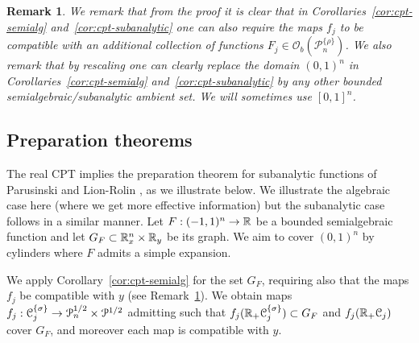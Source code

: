 \documentclass[reqno]{amsart}
\newtheorem{Rem}[Cor]{Remark}{\scshape}{\rmfamily}
\renewcommand\~[1]{\widetilde{#1}}
\def\cP{{\mathcal P}} \def\cR{{\mathcal R}}
\def\cO{{\mathcal O}}
\def\he#1{{\{#1\}}}
\def\hrho{{\he\rho}}
\def\hsigma{{\he\sigma}}
\begin{document}
\begin{Rem}\label{rem:cpt-semi-extra}
  We remark that from the proof it is clear that in
  Corollaries~\ref{cor:cpt-semialg} and~\ref{cor:cpt-subanalytic} one
  can also require the maps $f_j$ to be compatible with an additional
  collection of functions $F_j\in\cO_b(\cP_n^\hrho)$. We also remark
  that by rescaling one can clearly replace the domain $(0,1)^n$ in
  Corollaries~\ref{cor:cpt-semialg} and~\ref{cor:cpt-subanalytic} by
  any other bounded semialgebraic/subanalytic ambient set. We will
  sometimes use $[0,1]^n$.
\end{Rem}


\subsection{Preparation theorems}

The real CPT implies the preparation theorem for subanalytic functions
of Parusinski \cite{parusinski:preparation} and Lion-Rolin
\cite{lion-rolin}, as we illustrate below. We illustrate the algebraic
case here (where we get more effective information) but the
subanalytic case follows in a similar manner. Let $F:(-1,1)^n\to{\mathbb R}$ be
a bounded semialgebraic function and let $G_F\subset{\mathbb R}^n_x\times{\mathbb R}_y$
be its graph. We aim to cover $(0,1)^n$ by cylinders where $F$ admits
a simple expansion.

We apply Corollary~\ref{cor:cpt-semialg} for the set $G_F$, requiring
also that the maps $f_j$ be compatible with $y$ (see
Remark~\ref{rem:cpt-semi-extra}). We obtain maps
$f_j:\cC_j^\hsigma\to \cP_n^{1/2}\times\cP^{1/2}$ admitting such that
$f_j(\R_+\cC_j^\hsigma)\subset G_F$ and $f_j({\mathbb R}_+{\mathcal C}_j)$ cover $G_F$,
and moreover each map is compatible with $y$.
\end{document}

